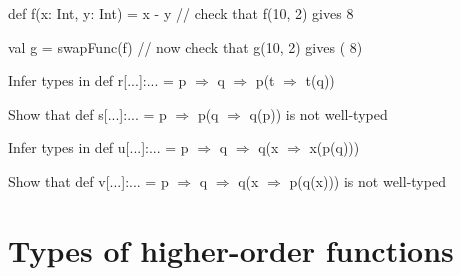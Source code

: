 def f(x: Int, y: Int) = x - y // check that f(10, 2) gives 8

val g = swapFunc(f)  // now check that g(10, 2) gives (\textendash{}
8)

Infer types in def r{[}...{]}:... = p $\Rightarrow$ q $\Rightarrow$
p(t $\Rightarrow$ t(q))

Show that def s{[}...{]}:... = p $\Rightarrow$ p(q $\Rightarrow$
q(p)) is not well-typed

Infer types in def u{[}...{]}:... = p $\Rightarrow$ q $\Rightarrow$
q(x $\Rightarrow$ x(p(q)))

Show that def v{[}...{]}:... = p $\Rightarrow$ q $\Rightarrow$ q(x
$\Rightarrow$ p(q(x))) is not well-typed

\section{Types of higher-order functions}

